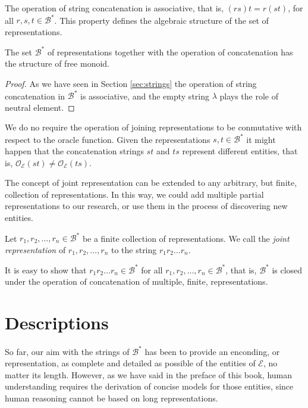 The operation of string concatenation is associative, that is, $(rs)t = r(st)$, for all $r, s, t \in \mathcal{B}^\ast$. This property defines the algebraic structure of the set of representations.

\begin{proposition}
The set $\mathcal{B}^\ast$ of representations together with the operation of concatenation has the structure of free monoid.
\end{proposition}
\begin{proof}
As we have seen in Section \ref{sec:strings} the operation of string concatenation in $\mathcal{B}^\ast$ is associative, and the empty string $\lambda$ plays the role of neutral element.
\end{proof}

We do no require the operation of joining representations to be conmutative with respect to the oracle function. Given the representations $s, t \in \mathcal{B}^\ast$ it might happen that the concatenation strings $st$ and $ts$ represent different entities, that is, $\mathcal{O}_\mathcal{E} \left( st \right) \neq \mathcal{O}_\mathcal{E} \left( ts \right)$.

The concept of joint representation can be extended to any arbitrary, but finite, collection of representations. In this way, we could add multiple partial representations to our research, or use them in the process of discovering new entities.

\begin{definition}
Let $r_1, r_2, \ldots, r_n \in \mathcal{B}^\ast$ be a finite collection of representations. We call the \emph{joint representation} of $r_1, r_2, \ldots, r_n$ to the string $r_1 r_2 \ldots r_n$.
\end{definition}

It is easy to show that $r_1 r_2 \ldots r_n \in \mathcal{B}^\ast$ for all $r_1, r_2, \ldots, r_n \in \mathcal{B}^\ast$, that is, $\mathcal{B}^\ast$ is closed under the operation of concatenation of multiple, finite, representations.

%
%

\section{Descriptions}
\label{sec:descriptions_models}

So far, our aim with the strings of $\mathcal{B}^\ast$ has been to provide an enconding, or representation, as complete and detailed as possible of the entities of $\mathcal{E}$, no matter its length. However, as we have said in the preface of this book, human understanding requires the derivation of concise models for those entities, since human reasoning cannot be based on long representations.

